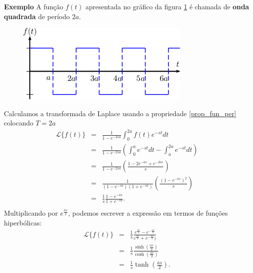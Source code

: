 \documentclass[a4paper,10pt]{book}
\begin{document}
{\bf Exemplo} A função $f(t)$ apresentada no gráfico da figura \ref{fig_onda_quadrada} é chamada de {\bf onda quadrada} de período $2a$.
 \begin{figure}[!ht]
\begin{center}

\includegraphics{figs/especiais_figura_1}\end{center}
\caption{\label{fig_onda_quadrada}}
\end{figure}
Calculamos a transformada de Laplace usando a propriedade \ref{prop_fun_per} colocando $T=2a$
\begin{eqnarray*}
\mathcal{L}\{f(t)\}&=& \frac{1}{1-e^{-2sa}}\int_0^{2a}f(t)e^{-st}dt\\
&=& \frac{1}{1-e^{-2sa}}\left(\int_0^{a}e^{-st}dt-\int_a^{2a}e^{-st}dt\right)\\
&=& \frac{1}{1-e^{-2sa}}\left(\frac{1-2e^{-as}+e^{-2as}}{s}\right)\\
&=& \frac{1}{(1-e^{-sa})(1+e^{-sa})}\left(\frac{(1-e^{-as})^2}{s}\right)\\
&=&\frac{1}{s} \frac{1-e^{-as}}{1+e^{-sa}}.\\
\end{eqnarray*}
Multiplicando por $e^{\frac{as}{2}}$, podemos escrever a expressão em termos de funções hiperbólicas:
\begin{eqnarray*}
\mathcal{L}\{f(t)\}&=&\frac{1}{s} \frac{e^{\frac{as}{2}}-e^{-\frac{as}{2}}}{e^{\frac{as}{2}}+e^{-\frac{as}{2}})}\\
&=&\frac{1}{s} \frac{\sinh\left(\frac{as}{2}\right)}{\cosh\left(\frac{as}{2}\right)}\\
&=&\frac{1}{s} \tanh\left(\frac{as}{2}\right).
\end{eqnarray*}
\end{document}
